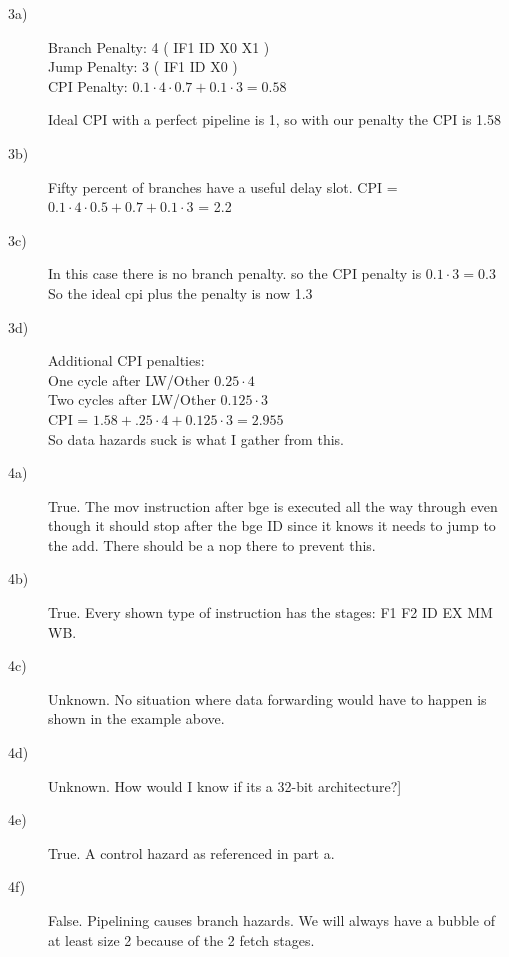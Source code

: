 \documentclass{article}
\begin{document}
\begin{description}
\item[3a)]
  Branch Penalty: 4 ( IF1 ID X0 X1 )\\
  Jump Penalty: 3 ( IF1 ID X0 )\\
  CPI Penalty: $0.1 \cdot 4 \cdot 0.7+ 0.1 \cdot 3 = 0.58$
 
  Ideal CPI with a perfect pipeline is 1, so with our penalty the CPI is 1.58
  
\item[3b)]
  Fifty percent of branches have a useful delay slot.
  CPI = $0.1 \cdot 4 \cdot 0.5 + 0.7 + 0.1 \cdot 3$ = 2.2
  
\item[3c)]
  In this case there is no branch penalty. so the CPI penalty is $0.1 \cdot 3 = 0.3$\\
  So the ideal cpi plus the penalty is now 1.3
  
\item[3d)]
  Additional CPI penalties:\\
  One cycle after LW/Other  $0.25 \cdot 4$\\
  Two cycles after LW/Other $0.125 \cdot 3$\\
  CPI = $1.58 + .25 \cdot 4 + 0.125 \cdot 3 = 2.955$\\
  So data hazards suck is what I gather from this.
  
\item[4a)]
  True. The mov instruction after bge is executed all the way through even though it should stop after the bge ID since it knows it needs to jump to the add. There should be a nop there to prevent this.
\item[4b)] True. Every shown type of instruction has the stages: F1 F2 ID EX MM WB. 
\item[4c)] Unknown. No situation where data forwarding would have to happen is shown in the example above.
\item[4d)] Unknown. How would I know if its a 32-bit architecture?]
\item[4e)] True. A control hazard as referenced in part a.
\item[4f)] False. Pipelining causes branch hazards. We will always have a bubble of at least size 2 because of the 2 fetch stages.
\end{description}
\end{document}

